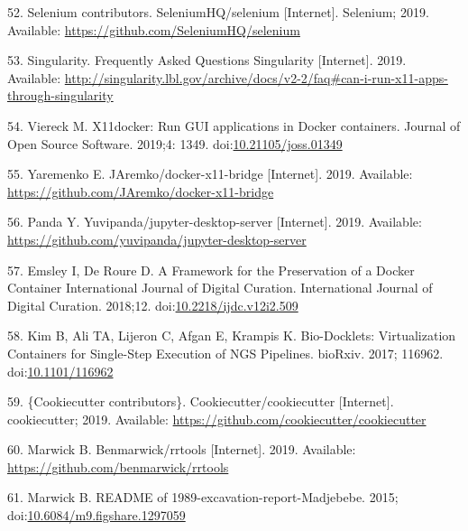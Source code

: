 \documentclass[10pt,letterpaper]{article}
\begin{document}
\leavevmode\hypertarget{ref-selenium_2019}{}%
52. Selenium contributors. SeleniumHQ/selenium {[}Internet{]}. Selenium;
2019. Available: \url{https://github.com/SeleniumHQ/selenium}

\leavevmode\hypertarget{ref-singularity_frequently_2019}{}%
53. Singularity. Frequently Asked Questions Singularity {[}Internet{]}.
2019. Available:
\url{http://singularity.lbl.gov/archive/docs/v2-2/faq\#can-i-run-x11-apps-through-singularity}

\leavevmode\hypertarget{ref-viereck_x11docker_2019}{}%
54. Viereck M. X11docker: Run GUI applications in Docker containers.
Journal of Open Source Software. 2019;4: 1349.
doi:\href{https://doi.org/10.21105/joss.01349}{10.21105/joss.01349}

\leavevmode\hypertarget{ref-yaremenko_docker-x11-bridge_2019}{}%
55. Yaremenko E. JAremko/docker-x11-bridge {[}Internet{]}. 2019.
Available: \url{https://github.com/JAremko/docker-x11-bridge}

\leavevmode\hypertarget{ref-yuvipanda_jupyter-desktop-server_2019}{}%
56. Panda Y. Yuvipanda/jupyter-desktop-server {[}Internet{]}. 2019.
Available: \url{https://github.com/yuvipanda/jupyter-desktop-server}

\leavevmode\hypertarget{ref-emsley_framework_2018}{}%
57. Emsley I, De Roure D. A Framework for the Preservation of a Docker
Container International Journal of Digital Curation. International
Journal of Digital Curation. 2018;12.
doi:\href{https://doi.org/10.2218/ijdc.v12i2.509}{10.2218/ijdc.v12i2.509}

\leavevmode\hypertarget{ref-kim_bio-docklets_2017}{}%
58. Kim B, Ali TA, Lijeron C, Afgan E, Krampis K. Bio-Docklets:
Virtualization Containers for Single-Step Execution of NGS Pipelines.
bioRxiv. 2017; 116962.
doi:\href{https://doi.org/10.1101/116962}{10.1101/116962}

\leavevmode\hypertarget{ref-cookiecutter_contributors_cookiecutter_2019}{}%
59. \{Cookiecutter contributors\}. Cookiecutter/cookiecutter
{[}Internet{]}. cookiecutter; 2019. Available:
\url{https://github.com/cookiecutter/cookiecutter}

\leavevmode\hypertarget{ref-marwick_rrtools_2019}{}%
60. Marwick B. Benmarwick/rrtools {[}Internet{]}. 2019. Available:
\url{https://github.com/benmarwick/rrtools}

\leavevmode\hypertarget{ref-marwick_readme_2015}{}%
61. Marwick B. README of 1989-excavation-report-Madjebebe. 2015;
doi:\href{https://doi.org/10.6084/m9.figshare.1297059}{10.6084/m9.figshare.1297059}
\end{document}
